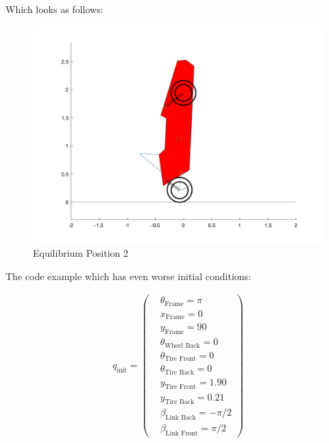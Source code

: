 Which looks as follows:

\begin{figure}[ht]
    \centering
    \includegraphics[scale=0.235]{images/Equilibrium2.jpg}
    \caption{Equilibrium Position 2}
    \label{fig:eq_2}
\end{figure}

The code example which has even worse initial conditions:

\begin{equation}\label{eq:4.5.5}
    \begin{split}
        q_{\text{init}} = 
        \begin{pmatrix}
            &\theta_{\text{Frame}} = \pi\\
            &x_{\text{Frame}} = 0\\
            &y_{\text{Frame}} = 90\\
            &\theta_{\text{Wheel Back}} = 0\\
            &\theta_{\text{Tire Front}} = 0\\
            &\theta_{\text{Tire Back}} = 0\\
            &y_{\text{Tire Front}} = 1.90\\
            &y_{\text{Tire Back}} = 0.21\\
            &\beta_{\text{Link Back}} = -\pi/2\\
            &\beta_{\text{Link Front}} = \pi/2
        \end{pmatrix}
    \end{split}
\end{equation}

